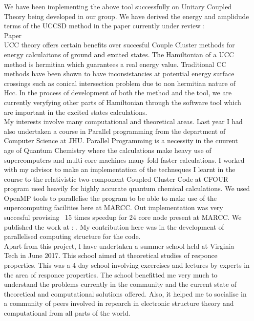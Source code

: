 \documentclass[11pt, oneside]{article}   	%
\begin{document}
We have been implementing the above tool successfully on Unitary Coupled Theory being developed in our group. We have derived the energy and amplidude terms of the UCCSD method in the paper currently under review :\\
Paper\\

UCC theory offers certain benefits over succesful Couple Cluster methods for energy calculaitons of ground and excited states. The Hamiltonian of a UCC method is hermitian which guarantees a real energy value. Traditional CC methods have been shown to have inconsistancies at potential energy surface crossings such as conical intersection problem due to non hermitian nature of Hcc. In the process of development of both the method and the tool, we are currently veryfying other parts of Hamiltonian through the software tool which are important in the excited states calculations.\\

My interests involve many computational and theoretical areas. Last year I had also undertaken a course in Parallel programming from the department of Computer Science at JHU. Parallel Programming is a necessity in the cuurent age of Quantum Chemistry where the calculations make heavy use of supercomputers and multi-core machines many fold faster calculations. I worked with my advisor to make an implementation of the techneques I learnt in the course to the relativistic two-component Coupled Cluster Code at CFOUR program used heavily for highly accurate quantum chemical calculations. We used OpenMP tools to parallelise the program to be able to make use of the supercomputing facilities here at MARCC. Out implementation was very succesful provising ~15 times speedup for 24 core node present at MARCC. We published the work at : . My contribution here was in the development of parallelised computing structure for the code. \\

Apart from this project, I have undertaken a summer school held at Virginia Tech in June 2017. This school aimed at theoretical studies of responce properties. This was a 4 day school involving excercises and lectures by experts in the area of responce properties. The school benefitted me very much to understand the problems currently in the community and the current state of theoretical and computational solutions offered. Also, it helped me to socialise in a community of peers involved in repearch in electronic structure theory and computational from all parts of the world.\\
\end{document}
